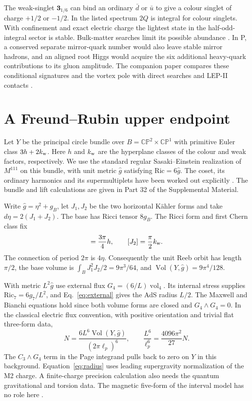 \documentclass[aps,prd,reprint,onecolumn,nofootinbib,amsmath,amssymb]{revtex4-2}
\begin{document}
The weak-singlet $\mathbf3_{1/6}$ can bind an ordinary $\bar d$ or $\bar u$ to give a colour singlet of charge $+1/2$ or $-1/2$. In the listed spectrum $2Q$ is integral for colour singlets. With confinement and exact electric charge the lightest state in the half-odd-integral sector is stable. Bulk-matter searches limit its possible abundance \cite{Lee2002Fractional}. In P, a conserved separate mirror-quark number would also leave stable mirror hadrons, and an aligned root Higgs would acquire the six additional heavy-quark contributions to its gluon amplitude. The companion paper compares these conditional signatures and the vortex pole with direct searches and LEP-II contacts \cite{TwoEndpoint2026}.

\section{A Freund--Rubin upper endpoint}
Let $Y$ be the principal circle bundle over $B=\mathbb{CP}^2\times\mathbb{CP}^1$ with primitive Euler class $3h+2k_{\rm w}$. Here $h$ and $k_{\rm w}$ are the hyperplane classes of the colour and weak factors, respectively. We use the standard regular Sasaki--Einstein realization of $M^{111}$ on this bundle, with unit metric $\hat g$ satisfying $\mathrm{Ric}=6\hat g$. The coset, its ordinary harmonics and its supermultiplets have been worked out explicitly \cite{Witten1981,Fabbri1999}. The bundle and lift calculations are given in Part 32 of the Supplemental Material.

Write $\hat g=\eta^2+g_B$, let $J_1,J_2$ be the two horizontal Kähler forms and take $d\eta=2(J_1+J_2)$. The base has Ricci tensor $8g_B$. The Ricci form and first Chern class fix
\begin{equation}
 [J_1]=\frac{3\pi}{4}h,\qquad [J_2]=\frac{\pi}{2}k_{\rm w} .
\end{equation}
The connection of period $2\pi$ is $4\eta$. Consequently the unit Reeb orbit has length $\pi/2$, the base volume is $\int_B J_1^2 J_2/2=9\pi^3/64$, and $\operatorname{Vol}(Y,\hat g)=9\pi^4/128$.

With metric $L^2\hat g$ use external flux $G_4=(6/L)\operatorname{vol}_4$. Its internal stress supplies $\mathrm{Ric}_7=6g_7/L^2$, and Eq.~\eqref{eq:external} gives the AdS radius $L/2$. The Maxwell and Bianchi equations hold since both volume forms are closed and $G_4\wedge G_4=0$. In the classical electric flux convention, with positive orientation and trivial flat three-form data,
\begin{equation}
 N=\frac{6L^6\operatorname{Vol}(Y,\hat g)}{(2\pi\ell_p)^6},
 \qquad
 \frac{L^6}{\ell_p^6}=\frac{4096\pi^2}{27}N .
 \label{eq:radius}
\end{equation}
The $C_3\wedge G_4$ term in the Page integrand pulls back to zero on $Y$ in this background. Equation~\eqref{eq:radius} uses leading supergravity normalization of the M2 charge. A finite-charge precision calculation also needs the quantum gravitational and torsion data. The magnetic five-form of the interval model has no role here \cite{FreundRubin1980,Fabbri1999}.
\end{document}
